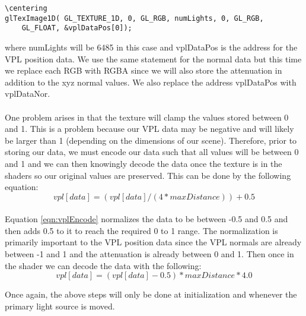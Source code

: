 \begin{lstlisting}
\centering
glTexImage1D( GL_TEXTURE_1D, 0, GL_RGB, numLights, 0, GL_RGB, 
	GL_FLOAT, &vplDataPos[0]);
\end{lstlisting}

where numLights will be 6485 in this case and vplDataPos is the address for the VPL position data.  We use the same statement for the normal data but this time we replace each RGB with RGBA since we will also store the attenuation in addition to the xyz normal values.  We also replace the address vplDataPos with vplDataNor.

\paragraph{}
One problem arises in that the texture will clamp the values stored between 0 and 1.  This is a problem because our VPL data may be negative and will likely be larger than 1 (depending on the dimensions of our scene).  Therefore, prior to storing our data, we must encode our data such that all values will be between 0 and 1 and we can then knowingly decode the data once the texture is in the shaders so our original values are preserved.  This can be done by the following equation:
\begin{equation}
vpl[data] = (vpl[data]/(4*maxDistance))+0.5 \label{eqn:vplEncode}
\end{equation}

\paragraph{}
Equation \ref{eqn:vplEncode} normalizes the data to be between -0.5 and 0.5 and then adds 0.5 to it to reach the required 0 to 1 range.  The normalization is primarily important to the VPL position data since the VPL normals are already between -1 and 1 and the attenuation is already between 0 and 1. Then once in the shader we can decode the data with the following:
\begin{equation}
vpl[data] = (vpl[data]-0.5)*maxDistance*4.0 \label{eqn:vplDecode}
\end{equation}

Once again, the above steps will only be done at initialization and whenever the primary light source is moved.

